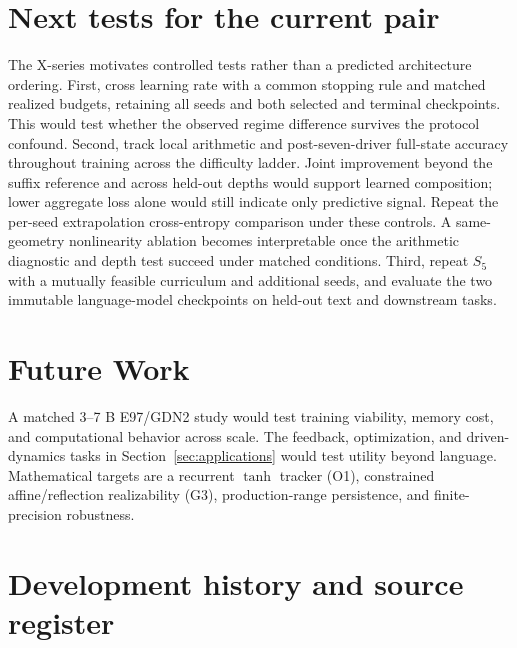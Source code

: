 \documentclass[10pt]{article}
\theoremstyle{canonical}
\theoremstyle{canonicalbullet}
\begin{document}
\section{Next tests for the current pair}\label{sec:predictions}


The X-series motivates controlled tests rather than a predicted architecture ordering. First, cross learning rate with a common stopping rule and matched realized budgets, retaining all seeds and both selected and terminal checkpoints. This would test whether the observed regime difference survives the protocol confound. Second, track local arithmetic and post-seven-driver full-state accuracy throughout training across the difficulty ladder. Joint improvement beyond the suffix reference and across held-out depths would support learned composition; lower aggregate loss alone would still indicate only predictive signal. Repeat the per-seed extrapolation cross-entropy comparison under these controls. A same-geometry nonlinearity ablation becomes interpretable once the arithmetic diagnostic and depth test succeed under matched conditions. Third, repeat ${S }_{5}$ with a mutually feasible curriculum and additional seeds, and evaluate the two immutable language-model checkpoints on held-out text and downstream tasks.


\section{Future Work}\label{sec:future_work}


A matched 3--7 B E97/GDN2 study would test training viability, memory cost, and computational behavior across scale. The feedback, optimization, and driven-dynamics tasks in Section~\ref{sec:applications} would test utility beyond language. Mathematical targets are a recurrent $\operatorname{tanh}$ tracker (O1), constrained affine/reflection realizability (G3), production-range persistence, and finite-precision robustness.







\clearpage



\clearpage\appendix

\section{Development history and source register}\label{sec:appendix}
\end{document}
